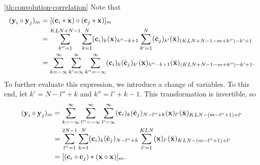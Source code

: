 \documentclass[a4paper, openany, oneside]{memoir}
\begin{document}
\begin{blockProofTheorem}{\ref{th:convolution-correlation}}
    Note that
    \begin{align*}
        (\boldsymbol{\mathbf{y}}_i \circ \boldsymbol{\mathbf{y}}_j)_m
        &= [(\boldsymbol{\mathbf{c}}_i \ast \boldsymbol{\mathbf{x}}) \circ (\boldsymbol{\mathbf{c}}_j \ast \boldsymbol{\mathbf{x}})]_m \\
        &=\sum_{k''=1}^{KLN+N-1}\sum_{k=1}^N (\boldsymbol{\mathbf{c}}_i)_k (\boldsymbol{\mathbf{x}})_{k''-k+1}\sum_{k'=1}^{N}(\bar{\boldsymbol{\mathbf{c}}}_j)_{k'}(\bar{\boldsymbol{\mathbf{x}}})_{(KLN+N-1-m+k'')-k'+1} \\
        &=\sum_{k=-\infty}^\infty\sum_{k'=\infty}^{\infty}\sum_{k''=-\infty}^{\infty} (\boldsymbol{\mathbf{c}}_i)_k (\bar{\boldsymbol{\mathbf{c}}}_j)_{k'}(\boldsymbol{\mathbf{x}})_{k''-k+1}(\bar{\boldsymbol{\mathbf{x}}})_{(KLN+N-1-m+k'')-k'+1}.
    \end{align*}
    To further evaluate this expression, we introduce a change of variables. To this end, let $k' = N -l'' +k$ and $k'' = l' + k - 1$. This transformation is invertible, so
    \begin{align*}
        (\boldsymbol{\mathbf{y}}_i \circ \boldsymbol{\mathbf{y}}_j)_m
        &=\sum_{k=-\infty}^\infty\sum_{l''=-\infty}^{\infty}\sum_{l'=\infty}^{\infty} (\boldsymbol{\mathbf{c}}_i)_k (\bar{\boldsymbol{\mathbf{c}}}_j)_{N -l'' +k}(\boldsymbol{\mathbf{x}})_{l'}
        (\bar{\boldsymbol{\mathbf{x}}})_{KLN-(m-l'' + 1)+l'} \\
        &=\sum_{l''=1}^{2N-1}\sum_{k=1}^{N}(\boldsymbol{\mathbf{c}}_i)_k (\bar{\boldsymbol{\mathbf{c}}}_j)_{N -l'' +k}\sum_{l'=1}^{KLN}(\boldsymbol{\mathbf{x}})_{l'}
        (\bar{\boldsymbol{\mathbf{x}}})_{KLN-(m-l'' + 1)+l'} \\
        &=[(\boldsymbol{\mathbf{c}}_i \circ \boldsymbol{\mathbf{c}}_j) \ast (\boldsymbol{\mathbf{x}} \circ \boldsymbol{\mathbf{x}})]_m.
    \end{align*}
\end{blockProofTheorem}
\end{document}
